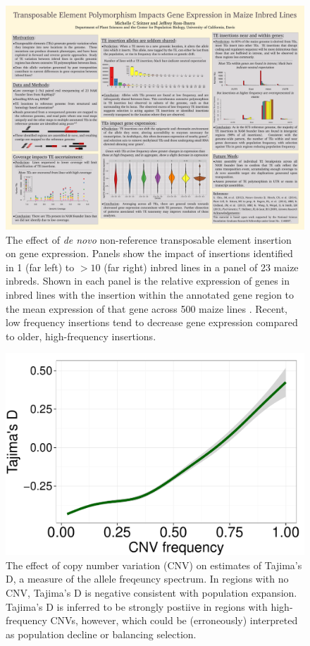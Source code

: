 \documentclass[11pt,letterpaper]{article}
\begin{document}
\begin{figure}[tb]
\includegraphics[width=0.45\linewidth]{figs/te_expression.pdf}
\caption{The effect of \emph{de novo} non-reference transposable element insertion on gene expression. Panels show the impact of insertions identified in 1 (far left) to $>10$ (far right) inbred lines in a panel of 23 maize inbreds.  Shown in each panel is the relative expression of genes in inbred lines with the insertion within the annotated gene region to the mean expression of that gene across 500 maize lines \citep{hirsch2014insights}. Recent, low frequency insertions tend to decrease gene expression compared to older, high-frequency insertions.  } 
\label{fig:te_expression}
\end{figure}

\begin{figure}
\includegraphics[width=0.3\linewidth]{figs/td_cnv.pdf}
\caption{The effect of copy number variation (CNV) on estimates of Tajima's D, a measure of the allele freqeuncy spectrum. In regions with no CNV, Tajima's D is negative consistent with population expansion. Tajima's D is inferred to be strongly postiive in regions with high-frequency CNVs, however, which could be (erroneously) interpreted as population decline or balancing selection.} 
\label{fig:tajd}
\end{figure}
%
\end{document}
